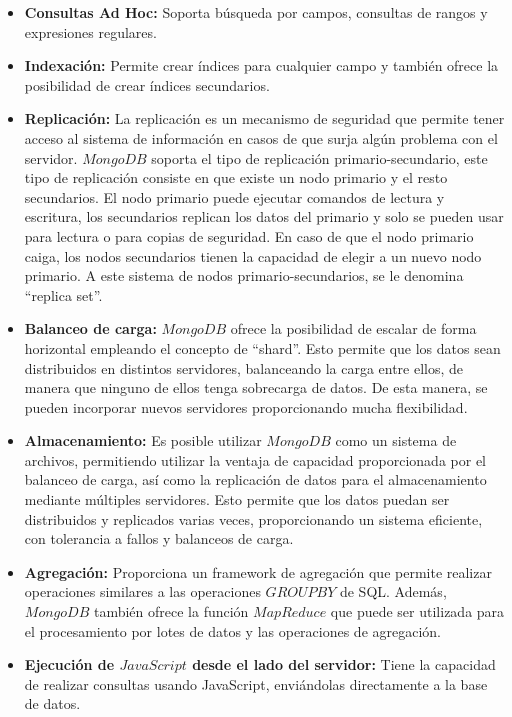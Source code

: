 \documentclass[12pt,a4paper]{article}
\begin{document}
\begin{itemize}
	\item \textbf{Consultas Ad Hoc:}
	Soporta búsqueda por campos, consultas de rangos y expresiones regulares.
	
	\item \textbf{Indexación:}
	 Permite crear índices para cualquier campo y también ofrece la posibilidad de crear índices secundarios. 

	\item \textbf{Replicación:}
	 La replicación es un mecanismo de seguridad que permite tener acceso al sistema de información en casos de que surja algún problema con el servidor. $MongoDB$ soporta el tipo de replicación primario-secundario, este tipo de replicación consiste en que existe un nodo primario y el resto secundarios. El nodo primario puede ejecutar comandos de lectura y escritura, los secundarios replican los datos del primario y solo se pueden usar para lectura o para copias de seguridad. En caso de que el nodo primario caiga, los nodos secundarios tienen la capacidad de elegir a un nuevo nodo primario. A este sistema de nodos primario-secundarios, se le denomina “replica set”.

	\item \textbf{Balanceo de carga:}
	$MongoDB$ ofrece la posibilidad de escalar de forma horizontal empleando el concepto de “shard”. Esto permite que los datos sean distribuidos en distintos servidores, balanceando la carga entre ellos, de manera que ninguno de ellos tenga sobrecarga de datos. De esta manera, se pueden incorporar nuevos servidores proporcionando mucha flexibilidad.
	\item \textbf{Almacenamiento:} 
	Es posible utilizar $MongoDB$ como un sistema de archivos, permitiendo utilizar la ventaja de capacidad proporcionada por el balanceo de carga, así como la replicación de datos para el almacenamiento mediante múltiples servidores. Esto permite que los datos puedan ser distribuidos y replicados varias veces, proporcionando un sistema eficiente, con tolerancia a fallos y balanceos de carga.
	\item \textbf{Agregación:}
	Proporciona un framework de agregación que permite realizar operaciones similares a las operaciones $GROUP BY$ de SQL. Además, $MongoDB$ también ofrece la función $MapReduce$ que puede ser utilizada para el procesamiento por lotes de datos y las operaciones de agregación.
	\item \textbf{Ejecución de $JavaScript$ desde el lado del servidor: }
	Tiene la capacidad de realizar consultas usando JavaScript, enviándolas directamente a la base de datos.

\end{itemize}
\end{document}
